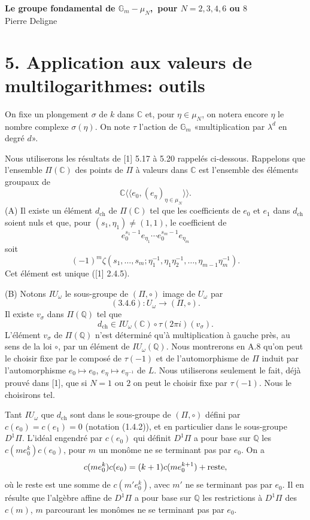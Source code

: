 \documentclass[10pt,a4paper]{article}
\newcommand{\Gm}{\mathbb G_m}
\newcommand{\Q}{\mathbb Q}
\newcommand{\C}{\mathbb C}
\theoremstyle{deligne}
\newcommand{\heading}[1]{\vspace{0.65em}\noindent{\bfseries #1}\quad}
\begin{document}
\begin{center}
{\Large\bfseries Le groupe fondamental de \(\Gm-\mu_N\),\ pour \(N=2,3,4,6\) ou \(8\)}\\[0.4em]
{\large Pierre Deligne}
\end{center}

\section*{5. Application aux valeurs de multilogarithmes: outils}

On fixe un plongement \(\sigma\) de \(k\) dans \(\C\) et, pour \(\eta\in\mu_N\), on notera encore \(\eta\) le nombre complexe \(\sigma(\eta)\). On note \(\tau\) l'action de \(\Gm\) «multiplication par \(\lambda^d\) en degré \(d\)».

\heading{5.1.} Nous utiliserons les résultats de [1] 5.17 à 5.20 rappelés ci-dessous. Rappelons que l'ensemble \(\Pi(\C)\) des points de \(\Pi\) à valeurs dans \(\C\) est l'ensemble des éléments groupaux de
\[
 \C\langle\!\langle e_0,(e_\eta)_{\eta\in\mu_N}\rangle\!\rangle .
\]
(A) Il existe un élément \(d_{\mathrm{ch}}\) de \(\Pi(\C)\) tel que les coefficients de \(e_0\) et \(e_1\) dans \(d_{\mathrm{ch}}\) soient nuls et que, pour \((s_1,\eta_1)\ne(1,1)\), le coefficient de
\[
 e_0^{s_1-1}e_{\eta_1}\cdots e_0^{s_m-1}e_{\eta_m}
\]
soit
\[
 (-1)^m\zeta(s_1,\ldots,s_m;\eta_1^{-1},\eta_1\eta_2^{-1},\ldots,\eta_{m-1}\eta_m^{-1}).
\]
Cet élément est unique ([1] 2.4.5).

(B) Notons \(IU_\omega\) le sous-groupe de \((\Pi,\circ)\) image de \(U_\omega\) par
\[
(3.4.6):U_\omega\longrightarrow(\Pi,\circ).
\]
Il existe \(v_\sigma\) dans \(\Pi(\Q)\) tel que
\[
\tag{5.1.1}
d_{\mathrm{ch}}\in IU_\omega(\C)\circ \tau(2\pi i)(v_\sigma).
\]
L'élément \(v_\sigma\) de \(\Pi(\Q)\) n'est déterminé qu'à multiplication à gauche près, au sens de la loi \(\circ\), par un élément de \(IU_\omega(\Q)\). Nous montrerons en A.8 qu'on peut le choisir fixe par le composé de \(\tau(-1)\) et de l'automorphisme de \(\Pi\) induit par l'automorphisme \(e_0\mapsto e_0\), \(e_\eta\mapsto e_{\eta^{-1}}\) de \(L\). Nous utiliserons seulement le fait, déjà prouvé dans [1], que si \(N=1\) ou \(2\) on peut le choisir fixe par \(\tau(-1)\). Nous le choisirons tel.

\heading{5.2.} Tant \(IU_\omega\) que \(d_{\mathrm{ch}}\) sont dans le sous-groupe de \((\Pi,\circ)\) défini par \(c(e_0)=c(e_1)=0\) (notation (1.4.2)), et en particulier dans le sous-groupe \(D^1\Pi\). L'idéal engendré par \(c(e_0)\) qui définit \(D^1\Pi\) a pour base sur \(\Q\) les \(c(me_0^k)c(e_0)\), pour \(m\) un monôme ne se terminant pas par \(e_0\). On a
\[
c(me_0^k)c(e_0)=(k+1)c(me_0^{k+1})+\hbox{reste},
\]
où le reste est une somme de \(c(m'e_0^k)\), avec \(m'\) ne se terminant pas par \(e_0\). Il en résulte que l'algèbre affine de \(D^1\Pi\) a pour base sur \(\Q\) les restrictions à \(D^1\Pi\) des \(c(m)\), \(m\) parcourant les monômes ne se terminant pas par \(e_0\).
\end{document}
